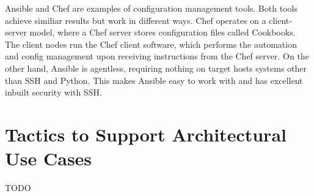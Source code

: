 Ansible and Chef are examples of configuration management tools. Both tools achieve similiar results but work in different ways. Chef operates on a client-server model, where a Chef server stores configuration files called Cookbooks. The client nodes run the Chef client software, which performs the automation and config management upon receiving instructions from the Chef server. On the other hand, Ansible is agentless, requiring nothing on target hosts systems other than SSH and Python. This makes Ansible easy to work with and has excellent inbuilt security with SSH.


\section{Tactics to Support Architectural Use Cases}
TODO
